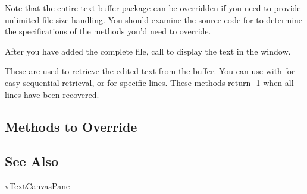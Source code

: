 Note that the entire text buffer package can be overridden
if you need to provide unlimited file size handling. You
should examine the source code for  to
determine the specifications of the methods you'd need
to override.


After you have added the complete file, call 
to display the text in the window.


These are used to retrieve the edited text from the buffer.
You can use  with  for
easy sequential retrieval, or  for specific
lines. These methods return -1 when all lines have been
recovered.



\subsection* {Methods to Override} %


\subsection* {See Also} %

vTextCanvasPane
